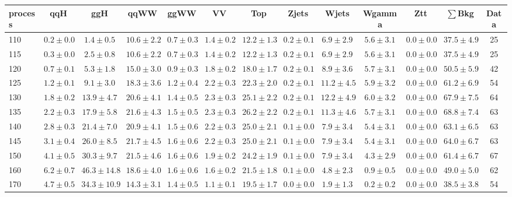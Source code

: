 \begin{table}
{%
 \tiny
 \begin{center}
 \begin{tabular}{l | c c | c c c c c c c c  | c c}
 \hline
 process & qqH & ggH & qqWW & ggWW & VV & Top & Zjets & Wjets & Wgamma & Ztt & $\sum$Bkg & Data \\
\hline
110 & $0.2\pm0.0$ & $1.4\pm0.5$ & $10.6\pm2.2$ & $0.7\pm0.3$ & $1.4\pm0.2$ & $12.2\pm1.3$ & $0.2\pm0.1$ & $6.9\pm2.9$ & $5.6\pm3.1$ & $0.0\pm0.0$ & $37.5\pm4.9$ & 25 \\
115 & $0.3\pm0.0$ & $2.5\pm0.8$ & $10.6\pm2.2$ & $0.7\pm0.3$ & $1.4\pm0.2$ & $12.2\pm1.3$ & $0.2\pm0.1$ & $6.9\pm2.9$ & $5.6\pm3.1$ & $0.0\pm0.0$ & $37.5\pm4.9$ & 25 \\
120 & $0.7\pm0.1$ & $5.3\pm1.8$ & $15.0\pm3.0$ & $0.9\pm0.3$ & $1.8\pm0.2$ & $18.0\pm1.7$ & $0.2\pm0.1$ & $8.9\pm3.6$ & $5.7\pm3.1$ & $0.0\pm0.0$ & $50.5\pm5.9$ & 42 \\
125 & $1.2\pm0.1$ & $9.1\pm3.0$ & $18.3\pm3.6$ & $1.2\pm0.4$ & $2.2\pm0.3$ & $22.3\pm2.0$ & $0.2\pm0.1$ & $11.2\pm4.5$ & $5.9\pm3.2$ & $0.0\pm0.0$ & $61.2\pm6.9$ & 54 \\
130 & $1.8\pm0.2$ & $13.9\pm4.7$ & $20.6\pm4.1$ & $1.4\pm0.5$ & $2.3\pm0.3$ & $25.1\pm2.2$ & $0.2\pm0.1$ & $12.2\pm4.9$ & $6.0\pm3.2$ & $0.0\pm0.0$ & $67.9\pm7.5$ & 64 \\
135 & $2.2\pm0.3$ & $17.9\pm5.8$ & $21.6\pm4.3$ & $1.5\pm0.5$ & $2.3\pm0.3$ & $26.2\pm2.2$ & $0.2\pm0.1$ & $11.3\pm4.6$ & $5.7\pm3.1$ & $0.0\pm0.0$ & $68.8\pm7.4$ & 63 \\
140 & $2.8\pm0.3$ & $21.4\pm7.0$ & $20.9\pm4.1$ & $1.5\pm0.6$ & $2.2\pm0.3$ & $25.0\pm2.1$ & $0.1\pm0.0$ & $7.9\pm3.4$ & $5.4\pm3.1$ & $0.0\pm0.0$ & $63.1\pm6.5$ & 63 \\
145 & $3.1\pm0.4$ & $26.0\pm8.5$ & $21.7\pm4.5$ & $1.6\pm0.6$ & $2.2\pm0.3$ & $25.0\pm2.1$ & $0.1\pm0.0$ & $7.9\pm3.4$ & $5.4\pm3.1$ & $0.0\pm0.0$ & $64.0\pm6.7$ & 63 \\
150 & $4.1\pm0.5$ & $30.3\pm9.7$ & $21.5\pm4.6$ & $1.6\pm0.6$ & $1.9\pm0.2$ & $24.2\pm1.9$ & $0.1\pm0.0$ & $7.9\pm3.4$ & $4.3\pm2.9$ & $0.0\pm0.0$ & $61.4\pm6.7$ & 67 \\
160 & $6.2\pm0.7$ & $46.3\pm14.8$ & $18.6\pm4.0$ & $1.6\pm0.6$ & $1.6\pm0.2$ & $21.5\pm1.8$ & $0.1\pm0.0$ & $4.8\pm2.3$ & $0.9\pm0.5$ & $0.0\pm0.0$ & $49.0\pm5.0$ & 62 \\
170 & $4.7\pm0.5$ & $34.3\pm10.9$ & $14.3\pm3.1$ & $1.4\pm0.5$ & $1.1\pm0.1$ & $19.5\pm1.7$ & $0.0\pm0.0$ & $1.9\pm1.3$ & $0.2\pm0.2$ & $0.0\pm0.0$ & $38.5\pm3.8$ & 54 \\

\end{tabular}
\end{center}}
\end{table}

